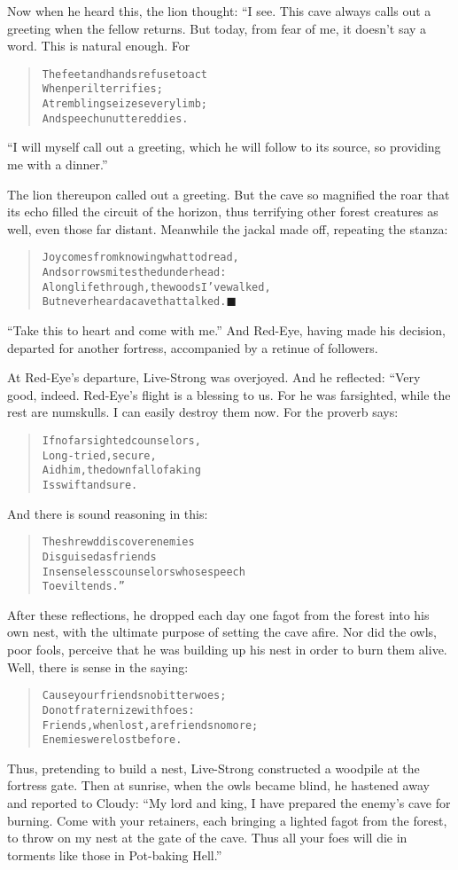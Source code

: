 \documentclass[article, twoside, 14pt]{memoir}
\newcommand{\qed}{\hfill \ensuremath{\blacksquare}}
\renewenvironment{verbatim}{%
\begin{quote}%
\vskip -10pt%
\begin{alltt}\normalfont\large}{\end{alltt}%
\end{quote}%
\vskip -10pt
} %
\begin{document}
Now when he heard this, the lion thought: “I see. This cave always
calls out a greeting when the fellow returns. But today, from fear
of me, it doesn't say a word. This is natural enough. For

\begin{verbatim}
The feet and hands refuse to act
    When peril terrifies;
A trembling seizes every limb;
    And speech unuttered dies.
\end{verbatim}
``I will myself call out a greeting, which he will follow to its source, so providing me with a dinner.''

The lion thereupon called out a greeting. But the cave so
magnified the roar that its echo filled the circuit of the horizon,
thus terrifying other forest creatures as well, even those far
distant. Meanwhile the jackal made off, repeating the stanza:

\begin{verbatim}
Joy comes from knowing what to dread,
And sorrow smites the dunderhead:
A long life through, the woods I've walked,
But never heard a cave that talked.\hyperref[s62]{\qed}
\end{verbatim}
``Take this to heart and come with me.'' And Red-Eye, having made
his decision, departed for another fortress, accompanied by a
retinue of followers.

At Red-Eye's departure, Live-Strong was overjoyed. And he
reflected: “Very good, indeed. Red-Eye's flight is a blessing to
us. For he was farsighted, while the rest are numskulls. I can
easily destroy them now. For the proverb says:

\begin{verbatim}
If no farsighted counselors,
    Long-tried, secure,
Aid him, the downfall of a king
    Is swift and sure.
\end{verbatim}
And there is sound reasoning in this:

\begin{verbatim}
The shrewd discover enemies
    Disguised as friends
In senseless counselors whose speech
    To evil tends.”
\end{verbatim}
After these reflections, he dropped each day one fagot from the
forest into his own nest, with the ultimate purpose of setting the
cave afire. Nor did the owls, poor fools, perceive that he was
building up his nest in order to burn them alive. Well, there is
sense in the saying:

\begin{verbatim}
Cause your friends no bitter woes;
Do not fraternize with foes:
Friends, when lost, are friends no more;
Enemies were lost before.
\end{verbatim}
Thus, pretending to build a nest, Live-Strong constructed a
woodpile at the fortress gate. Then at sunrise, when the owls
became blind, he hastened away and reported to Cloudy:
``My lord and king, I have prepared the enemy's cave for burning. Come with your retainers, each bringing a lighted fagot from the forest, to throw on my nest at the gate of the cave. Thus all your foes will die in torments like those in Pot-baking Hell.''
\end{document}
